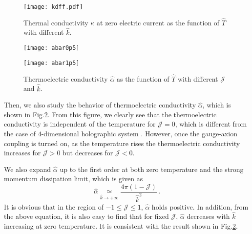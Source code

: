 \documentclass[preprint,onecolumn,nofootinbib]{revtex4}
\begin{document}
\begin{figure}[H]
	\centering
	\texttt{[image: kdff.pdf]}
	\caption{Thermal conductivity $\kappa$ at zero electric current as the function of $\hat{T}$ with different  $\hat{k}$.}
	\label{fig:5}
\end{figure}
\begin{figure}[H]
	\begin{minipage}[t]{0.5\linewidth}
		\centering
		\texttt{[image: abar0p5]}
	\end{minipage}
	\begin{minipage}[t]{0.5\linewidth}
		\centering
		\texttt{[image: abar1p5]}
	\end{minipage}
	\caption{Thermoelectric conductivity $\hat{\alpha}$ as the function of $\hat{T}$ with different  $\mathcal{J}$   and $\hat{k}$.}
	\label{fig:4}
\end{figure}
Then, we also study the behavior of thermoelectric conductivity $\hat{\alpha}$, which is shown in Fig.\ref{fig:4}. From this figure, we clearly see that the thermoelectric conductivity is independent of the temperature for $ \mathcal{J} =0 $, which is different from the case of $4$-dimensional holographic system \cite{Gouteraux:2016wxj,Baggioli:2016pia,Li:2018vrz}. However, once the gauge-axion coupling is turned on, as the temperature rises the thermoelectric conductivity increases for $\mathcal{J}>0$ but decreases for $\mathcal{J}<0$.

We also expand $\hat{\alpha}$ up to the first order at both zero temperature and the strong momentum dissipation limit, which is given as
\begin{equation}
	\hat{\alpha}\underset{\hat{k} \rightarrow +\infty}{\simeq}\frac{4\pi(1-\mathcal{J})}{\hat{k}^2}\,.
\end{equation}
It is obvious that in the region of $-1\leq\mathcal{J}\leq 1$, $\hat{\alpha}$ holds positive. In addition, from the above equation, it is also easy to find that for fixed $\mathcal{J}$, $\hat{\alpha}$ decreases with $\hat{k}$ increasing at zero temperature. It is consistent with the result shown in Fig.\ref{fig:4}.
\end{document}
